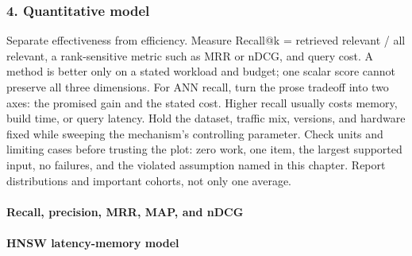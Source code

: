 \subsubsection*{4. Quantitative model}
Separate effectiveness from efficiency. Measure Recall@k = retrieved relevant / all relevant, a rank-sensitive metric such as MRR or nDCG, and query cost. A method is better only on a stated workload and budget; one scalar score cannot preserve all three dimensions.
For ANN recall, turn the prose tradeoff into two axes: the promised gain and the stated cost. Higher recall usually costs memory, build time, or query latency. Hold the dataset, traffic mix, versions, and hardware fixed while sweeping the mechanism's controlling parameter.
Check units and limiting cases before trusting the plot: zero work, one item, the largest supported input, no failures, and the violated assumption named in this chapter. Report distributions and important cohorts, not only one average.
\paragraph{Recall, precision, MRR, MAP, and nDCG}
\paragraph{HNSW latency-memory model}
